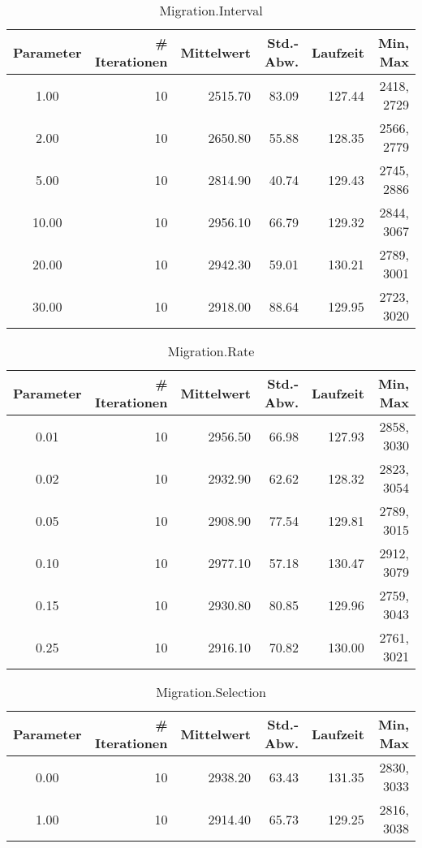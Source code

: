 \begin{table}[tbph]
\begin{tabular}{ | c || r | r | r | r | r | }
\hline
Parameter & \# Iterationen & Mittelwert & Std.-Abw. & Laufzeit & Min, Max \\
\hline
   1.00 &  10 & 2515.70 &   83.09 &  127.44 & 2418, 2729 \\
   2.00 &  10 & 2650.80 &   55.88 &  128.35 & 2566, 2779 \\
   5.00 &  10 & 2814.90 &   40.74 &  129.43 & 2745, 2886 \\
  10.00 &  10 & 2956.10 &   66.79 &  129.32 & 2844, 3067 \\
  20.00 &  10 & 2942.30 &   59.01 &  130.21 & 2789, 3001 \\
  30.00 &  10 & 2918.00 &   88.64 &  129.95 & 2723, 3020 \\
\hline
\end{tabular}
\caption{Migration.Interval}\label{Migration.Interval}
\end{table}


\begin{table}[tbph]
\begin{tabular}{ | c || r | r | r | r | r | }
\hline
Parameter & \# Iterationen & Mittelwert & Std.-Abw. & Laufzeit & Min, Max \\
\hline
   0.01 &  10 & 2956.50 &   66.98 &  127.93 & 2858, 3030 \\
   0.02 &  10 & 2932.90 &   62.62 &  128.32 & 2823, 3054 \\
   0.05 &  10 & 2908.90 &   77.54 &  129.81 & 2789, 3015 \\
   0.10 &  10 & 2977.10 &   57.18 &  130.47 & 2912, 3079 \\
   0.15 &  10 & 2930.80 &   80.85 &  129.96 & 2759, 3043 \\
   0.25 &  10 & 2916.10 &   70.82 &  130.00 & 2761, 3021 \\
\hline
\end{tabular}
\caption{Migration.Rate}\label{Migration.Rate}
\end{table}


\begin{table}[tbph]
\begin{tabular}{ | c || r | r | r | r | r | }
\hline
Parameter & \# Iterationen & Mittelwert & Std.-Abw. & Laufzeit & Min, Max \\
\hline
   0.00 &  10 & 2938.20 &   63.43 &  131.35 & 2830, 3033 \\
   1.00 &  10 & 2914.40 &   65.73 &  129.25 & 2816, 3038 \\
\hline
\end{tabular}
\caption{Migration.Selection}\label{Migration.Selection}
\end{table}


